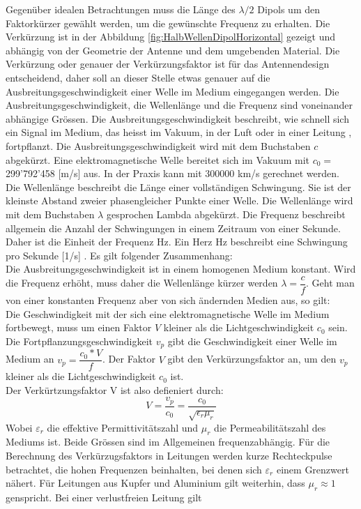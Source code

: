 \newpage
Gegenüber idealen Betrachtungen muss die Länge des $\lambda /2$ Dipols um den Faktorkürzer gewählt werden, um  die gewünschte Frequenz zu erhalten. Die Verkürzung  ist in der Abbildung \ref{fig:HalbWellenDipolHorizontal} gezeigt und abhängig von der Geometrie der Antenne und dem umgebenden Material.\cite{Hcuno}
Die Verkürzung oder genauer der Verkürzungsfaktor ist für das Antennendesign entscheidend, daher soll an dieser Stelle etwas genauer auf die Ausbreitungsgeschwindigkeit einer Welle im Medium eingegangen werden.
Die Ausbreitungsgeschwindigkeit, die Wellenlänge und die Frequenz sind voneinander abhängige Grössen. 
Die Ausbreitungsgeschwindigkeit beschreibt, wie schnell sich ein Signal im Medium, das heisst im Vakuum, in der Luft oder in einer Leitung , fortpflanzt. Die Ausbreitungsgeschwindigkeit wird mit dem Buchstaben $c$ abgekürzt. Eine elektromagnetische Welle bereitet sich im
Vakuum mit $c_0 = $ 299'792’458 [m/s] aus. In der Praxis kann mit 300000 km/s gerechnet werden.
Die Wellenlänge beschreibt die Länge einer vollständigen Schwingung. Sie ist der kleinste Abstand zweier phasengleicher Punkte einer Welle. Die Wellenlänge wird mit dem Buchstaben $\lambda$ gesprochen Lambda abgekürzt. Die Frequenz beschreibt allgemein die Anzahl der Schwingungen in einem  Zeitraum von einer Sekunde. Daher ist die Einheit der Frequenz Hz. Ein Herz Hz beschreibt eine Schwingung pro Sekunde [1/s] \cite{Verkuertzungsfaktor}.
Es gilt folgender Zusammenhang:\\
Die Ausbreitungsgeschwindigkeit ist in einem homogenen Medium konstant. Wird die Frequenz erhöht, muss daher die Wellenlänge kürzer werden $\lambda = \dfrac{c}{f}$. Geht man von einer konstanten Frequenz aber von sich ändernden Medien aus, so gilt: \\
Die Geschwindigkeit mit der sich eine elektromagnetische Welle im Medium fortbewegt, muss um einen Faktor $V$ kleiner  als die Lichtgeschwindigkeit $c_0$ sein.\\
Die Fortpflanzungsgeschwindigkeit $v_p$ gibt die Geschwindigkeit einer Welle im Medium an  $v_p=\dfrac{c_0*V}{f} $. Der Faktor $V$ gibt den Verkürzungsfaktor an, um den $v_p$ kleiner als die Lichtgeschwindigkeit $c_0$ ist. \\
Der Verkürtzungsfaktor V ist also defieniert durch:
\begin{equation}
V=\dfrac{v_p}{c_0}=\dfrac{c_0}{\sqrt{\epsilon_r \mu_r}}
\end{equation}
Wobei $\varepsilon_r$ die effektive Permittivitätszahl und $\mu_r$ die Permeabilitätszahl des Mediums ist. Beide Grössen sind im Allgemeinen frequenzabhängig. Für die Berechnung des Verkürzugsfaktors in Leitungen werden kurze Rechteckpulse betrachtet, die hohen Frequenzen beinhalten, bei denen sich $\varepsilon_r$ einem Grenzwert nähert. Für Leitungen aus Kupfer und Aluminium gilt weiterhin, dass $\mu_r \approx 1$ genspricht. Bei einer verlustfreien Leitung gilt\cite{Verkuertzungsfaktor_wiki}
